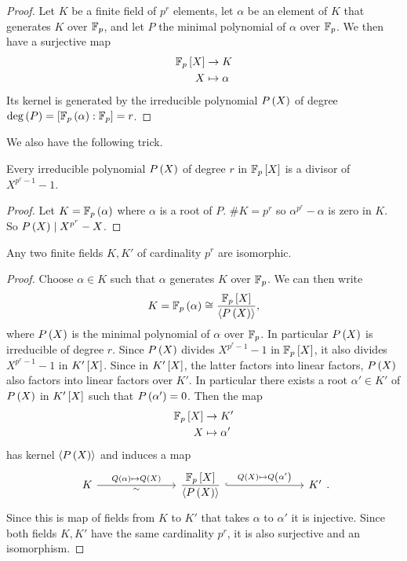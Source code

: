 \begin{proof}
Let $ K $ be a finite field of $ p^r $ elements, let $ \alpha $ be an element of $ K $ that generates $ K $ over $ \F_p $, and let $ P $ the minimal polynomial of $ \alpha $ over $ \F_p $. We then have a surjective map
\begin{align*}
\F_p\sb{X} & \to K \\
X & \mapsto \alpha
\end{align*}
Its kernel is generated by the irreducible polynomial $ P\rb{X} $ of degree $ \deg\rb{P} = \sb{\F_p\rb{\alpha} : \F_p} = r $.
\end{proof}

We also have the following trick.

\begin{lemma}
Every irreducible polynomial $ P\rb{X} $ of degree $ r $ in $ \F_p\sb{X} $ is a divisor of $ X^{p^r - 1} - 1 $.
\end{lemma}

\begin{proof}
Let $ K = \F_p\rb{\alpha} $ where $ \alpha $ is a root of $ P $. $ \#K = p^r $ so $ \alpha^{p^r} - \alpha $ is zero in $ K $. So $ P\rb{X} \mid X^{p^r} - X $.
\end{proof}

\begin{corollary}
Any two finite fields $ K, K' $ of cardinality $ p^r $ are isomorphic.
\end{corollary}

\begin{proof}
Choose $ \alpha \in K $ such that $ \alpha $ generates $ K $ over $ \F_p $. We can then write
$$ K = \F_p\rb{\alpha} \cong \dfrac{\F_p\sb{X}}{\ab{P\rb{X}}}, $$
where $ P\rb{X} $ is the minimal polynomial of $ \alpha $ over $ \F_p $. In particular $ P\rb{X} $ is irreducible of degree $ r $. Since $ P\rb{X} $ divides $ X^{p^r - 1} - 1 $ in $ \F_p\sb{X} $, it also divides $ X^{p^r - 1} - 1 $ in $ K'\sb{X} $. Since in $ K'\sb{X} $, the latter factors into linear factors, $ P\rb{X} $ also factors into linear factors over $ K' $. In particular there exists a root $ \alpha' \in K' $ of $ P\rb{X} $ in $ K'\sb{X} $ such that $ P\rb{\alpha'} = 0 $. Then the map
\begin{align*}
\F_p\sb{X} & \to K' \\
X & \mapsto \alpha'
\end{align*}
has kernel $ \ab{P\rb{X}} $ and induces a map
$$
\begin{tikzcd}[column sep=1in]
K \arrow{r}{Q\rb{\alpha} \mapsto Q\rb{X}}[swap]{\sim} & \dfrac{\F_p\sb{X}}{\ab{P\rb{X}}} \arrow[hookrightarrow]{r}{Q\rb{X} \mapsto Q\rb{\alpha'}} & K'
\end{tikzcd}.
$$
Since this is map of fields from $ K $ to $ K' $ that takes $ \alpha $ to $ \alpha' $ it is injective. Since both fields $ K, K' $ have the same cardinality $ p^r $, it is also surjective and an isomorphism.
\end{proof}

